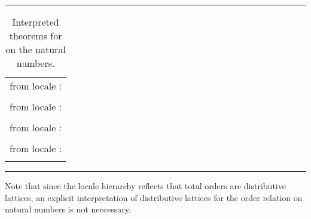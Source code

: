 \begin{isabellebody}
\begin{isamarkuptext}
\begin{table}
\hrule
\vspace{2ex}
\begin{center}
\begin{tabular}{l}
  \isa{nat{\isachardot}less{\isacharunderscore}def} from locale \isa{partial{\isacharunderscore}order}: \\
  \quad \isa{{\isacharparenleft}{\isacharquery}x\ {\isacharless}\ {\isacharquery}y{\isacharparenright}\ {\isacharequal}\ {\isacharparenleft}{\isacharquery}x\ {\isasymle}\ {\isacharquery}y\ {\isasymand}\ {\isacharquery}x\ {\isasymnoteq}\ {\isacharquery}y{\isacharparenright}} \\
  \isa{nat{\isachardot}meet{\isacharunderscore}left} from locale \isa{lattice}: \\
  \quad \isa{min\ {\isacharquery}x\ {\isacharquery}y\ {\isasymle}\ {\isacharquery}x} \\
  \isa{nat{\isachardot}join{\isacharunderscore}distr} from locale \isa{distrib{\isacharunderscore}lattice}: \\
  \quad \isa{max\ {\isacharquery}x\ {\isacharparenleft}min\ {\isacharquery}y\ {\isacharquery}z{\isacharparenright}\ {\isacharequal}\ min\ {\isacharparenleft}max\ {\isacharquery}x\ {\isacharquery}y{\isacharparenright}\ {\isacharparenleft}max\ {\isacharquery}x\ {\isacharquery}z{\isacharparenright}} \\
  \isa{nat{\isachardot}less{\isacharunderscore}total} from locale \isa{total{\isacharunderscore}order}: \\
  \quad \isa{{\isacharquery}x\ {\isacharless}\ {\isacharquery}y\ {\isasymor}\ {\isacharquery}x\ {\isacharequal}\ {\isacharquery}y\ {\isasymor}\ {\isacharquery}y\ {\isacharless}\ {\isacharquery}x}
\end{tabular}
\end{center}
\hrule
\caption{Interpreted theorems for \isa{{\isasymle}} on the natural numbers.}
\label{tab:nat-lattice}
\end{table}

  Note that since the locale hierarchy reflects that total orders are
  distributive lattices, an explicit interpretation of distributive
  lattices for the order relation on natural numbers is not neccessary.


\end{isamarkuptext}
\end{isabellebody}
